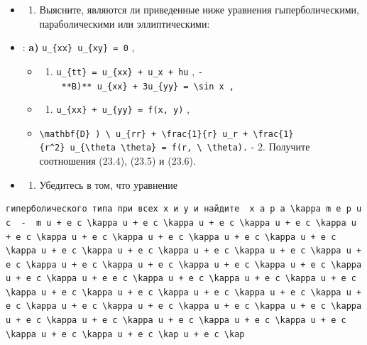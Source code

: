 \documentclass[
  ukrainian,
]{article}
\providecommand{\tightlist}{%
  \setlength{\itemsep}{0pt}\setlength{\parskip}{0pt}}
\begin{document}
\begin{itemize}
\tightlist
\item
  \begin{enumerate}
  \def\labelenumi{\arabic{enumi}.}
  \tightlist
  \item
    Выясните, являются ли приведенные ниже уравнения гыперболическими,
    параболическими или эллиптическими:
  \end{enumerate}
\item
  : \textbf{a)} \texttt{u\_\{xx\}\ u\_\{xy\}\ =\ 0} ,

  \begin{itemize}
  \tightlist
  \item
    \begin{enumerate}
    \def\labelenumi{\arabic{enumi})}
    \setcounter{enumi}{5}
    \tightlist
    \item
      \texttt{u\_\{tt\}\ =\ u\_\{xx\}\ +\ u\_x\ +\ hu} ,
      \texttt{-\ **B)**\ \textquotesingle{}u\_\{xx\}\ +\ 3u\_\{yy\}\ =\ \textbackslash{}sin\ x\textquotesingle{}\ ,}
    \end{enumerate}
  \item
    \begin{enumerate}
    \def\labelenumi{\alph{enumi})}
    \setcounter{enumi}{17}
    \tightlist
    \item
      \texttt{u\_\{xx\}\ +\ u\_\{yy\}\ =\ f(x,\ y)} ,
    \end{enumerate}
  \item
    \texttt{\textbackslash{}mathbf\{D\}\ )\ \textbackslash{}\ u\_\{rr\}\ +\ \textbackslash{}frac\{1\}\{r\}\ u\_r\ +\ \textbackslash{}frac\{1\}\{r\^{}2\}\ u\_\{\textbackslash{}theta\ \textbackslash{}theta\}\ =\ f(r,\ \textbackslash{}\ \textbackslash{}theta).}
    - 2. Получите соотношения (23.4), (23.5) и (23.6).
  \end{itemize}
\item
  \begin{enumerate}
  \def\labelenumi{\arabic{enumi}.}
  \setcounter{enumi}{2}
  \tightlist
  \item
    Убедитесь в том, что уравнение
  \end{enumerate}
\end{itemize}

\begin{verbatim}
гиперболического типа при всех x и y и найдите  x a p a \kappa m e p u c  -  m u + e c \kappa u + e c \kappa u + e c \kappa u + e c \kappa u + e c \kappa u + e c \kappa u + e c \kappa u + e c \kappa u + e c \kappa u + e c \kappa u + e c \kappa u + e c \kappa u + e c \kappa u + e c \kappa u + e c \kappa u + e c \kappa u + e c \kappa u + e c \kappa u + e c \kappa u + e e c \kappa u + e c \kappa u + e c \kappa u + e c \kappa u + e c \kappa u + e c \kappa u + e c \kappa u + e c \kappa u + e c \kappa u + e c \kappa u + e c \kappa u + e c \kappa u + e c \kappa u + e c \kappa u + e c \kappa u + e c \kappa u + e c \kappa u + e c \kappa u + e c \kappa u + e c \kap u + e c \kap
\end{verbatim}
\end{document}

